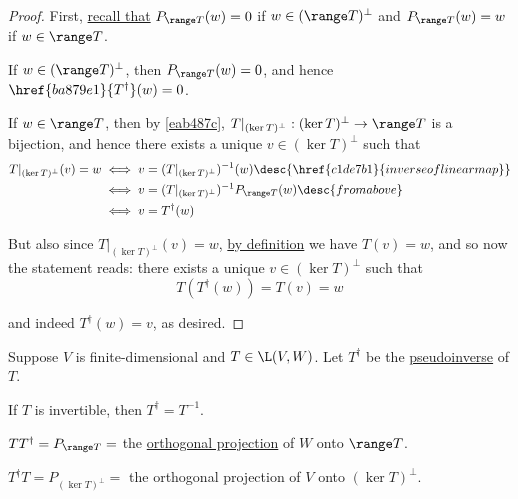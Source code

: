 \begin{proof}
  First, \href{f012eec}{recall that} $P_{\range T}(w)=0$ if $w\in(\range
  T)^\perp$ and $P_{\range T}(w)=w$ if $w\in\range T$.

   If $w\in(\range T)^\perp$, then $P_{\range T}(w)=0$, and hence
  $\href{ba879e1}{T^\dagger}(w)=0$.

   If $w\in\range T$, then by \autoref{eab487c}, $T|_{(\ker
  T)^\perp}:(\ker T)^\perp\to\range T$ is a bijection, and hence there exists a
  unique $v\in(\ker T)^\perp$ such that
  \begin{align*}
    T|_{(\ker T)^\perp}(v)=w
     &\iff v=(T|_{(\ker T)^\perp})^{-1}(w)\desc{\href{c1de7b1}{inverse of linear map}} \\
     &\iff v=(T|_{(\ker T)^\perp})^{-1}P_{\range T}(w)\desc{from above}                \\
     &\iff v=T^\dagger(w)
  \end{align*}

  But also since $T|_{(\ker T)^\perp}(v)=w$, \href{efec72b}{by definition} we
  have $T(v)=w$, and so now the statement reads: there exists a unique
  $v\in(\ker T)^\perp$ such that
  $$
    T(T^\dagger(w))=T(v)=w
  $$

  and indeed $T^\dagger(w)=v$, as desired.
\end{proof}

\label{ea0037c}

Suppose $V$ is finite-dimensional and $T\in\L(V,W)$. Let $T^\dagger$ be the
\href{ba879e1}{pseudoinverse} of $T$.
\begin{enumerata}
  \item If $T$ is invertible, then $T^\dagger=T^{-1}$.
  \item $TT^\dagger=P_{\range T}=$ the \href{dbfa2fa}{orthogonal projection} of
  $W$ onto $\range T$.
  \item $T^\dagger T=P_{(\ker T)^\perp}=$ the orthogonal projection of $V$ onto
  $(\ker T)^\perp$.
\end{enumerata}

